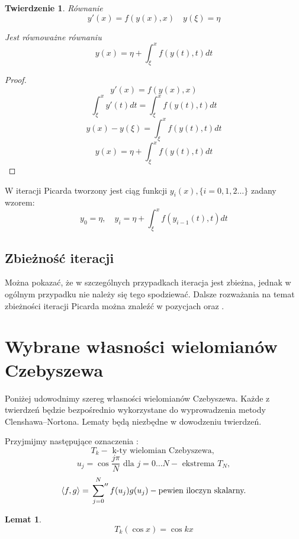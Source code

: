 \documentclass{article}
\newtheorem{theorem}{Twierdzenie}
\newtheorem{lemma}{Lemat}
\newcommand{\sumbis}[3] {
	\sideset{}{''}\sum_{#1}^{#2} #3
}
\newcommand{\dotproduct}[2] {
	\langle #1 , #2 \rangle
}
\begin{document}
	\begin{theorem}
	Równanie
	$$ y'(x) = f(y(x), x) \quad y(\xi) = \eta $$
	
	Jest równoważne równaniu
	$$ y(x) = \eta + \int_{\xi}^{x} f(y(t), t) dt $$
	\end{theorem}
	
	\begin{proof}
		$$ y'(x) = f(y(x), x) $$
		$$ \int_{\xi}^{x} y'(t) dt = \int_{\xi}^{x} f(y(t), t) dt $$
		$$ y(x) - y(\xi) = \int_{\xi}^{x} f(y(t), t) dt $$
		$$ y(x) = \eta + \int_{\xi}^{x} f(y(t), t) dt $$
	\end{proof}
	W iteracji Picarda tworzony jest ciąg funkcji $ y_{i}(x) , \{ i=0,1,2 \ldots \} $ zadany wzorem:	
		\begin{equation}
			\label{eq:picard}
			y_0 = \eta , \quad y_i = \eta + \int_{\xi}^{x} f(y_{i-1}(t), t) dt
		\end{equation}
		
	\subsection{Zbieżność iteracji}
		Można pokazać, że w szczególnych przypadkach iteracja jest zbieżna, jednak w ogólnym przypadku nie należy się tego spodziewać. Dalsze rozważania na temat zbieżności iteracji Picarda można znaleźć w pozycjach \cite{article} oraz \cite{picard}.
	
	
\section{Wybrane własności wielomianów Czebyszewa}

Poniżej udowodnimy szereg własności wielomianów Czebyszewa. Każde z twierdzeń będzie bezpośrednio wykorzystane do wyprowadzenia metody Clenshawa--Nortona. Lematy będą niezbędne w dowodzeniu twierdzeń.

Przyjmijmy następujące oznaczenia :
$$ T_{k} - \text{ k-ty wielomian Czebyszewa, } $$
$$u_{j} = \cos{  \frac{j \pi }{N}  } \text{ dla } j=0 \ldots N   - \text{ ekstrema } T_{N}, $$ 
\begin{equation}
	\label{eq:dot}
	\dotproduct{f}{g} = \sumbis{j=0}{N}{f(u_{j}) g(u_{j})} - \text{pewien iloczyn skalarny.} 
\end{equation}

\begin{lemma}
	\begin{equation}
		T_k(\cos{x}) = \cos{kx}
	\end{equation}
\end{lemma}
\end{document}

